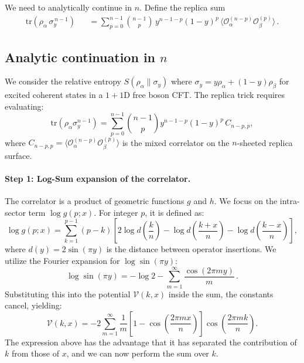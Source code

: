 \documentclass[11pt]{article}
\newcommand{\tr}{\mathrm{tr}}
\begin{document}
We need to analytically continue in $n$. Define the replica sum
\begin{eqnarray}\label{Fn}
\tr(\rho_\alpha\,\sigma_y^{\,n-1})
&&= \sum_{p=0}^{n-1} \binom{n-1}{p}\,y^{n-1-p}(1-y)^p\,
\langle \mathcal{O}_{\alpha}^{(n-p)} \mathcal{O}_{\beta}^{(p)} \rangle\,.
\end{eqnarray}

\subsection*{Analytic continuation in $n$}

We consider the relative entropy $S(\rho_\alpha \| \sigma_y)$ where $\sigma_y = y \rho_\alpha + (1-y)\rho_\beta$ for excited coherent states in a $1+1$D free boson CFT. The replica trick requires evaluating:
\begin{equation}
\tr(\rho_\alpha \sigma_y^{n-1}) = \sum_{p=0}^{n-1} \binom{n-1}{p} y^{n-1-p} (1-y)^p\, C_{n-p, p},
\end{equation}
where $C_{n-p, p} = \langle \mathcal{O}_\alpha^{(n-p)} \mathcal{O}_\beta^{(p)} \rangle$ is the mixed correlator on the $n$-sheeted replica surface.

\paragraph{Step 1: Log-Sum expansion of the correlator.}
The correlator is a product of geometric functions $g$ and $h$. We focus on the intra-sector term $\log g(p;x)$. For integer $p$, it is defined as:
\begin{equation}
\log g(p;x) = \sum_{k=1}^{p-1} (p-k) \left[ 2 \log d\left(\frac{k}{n}\right) - \log d\left(\frac{k+x}{n}\right) - \log d\left(\frac{k-x}{n}\right) \right],
\end{equation}
where $d(y) = 2\sin(\pi y)$ is the distance between operator insertions. We utilize the Fourier expansion for $\log \sin(\pi y)$:
\begin{equation}
\log \sin(\pi y) = -\log 2 - \sum_{m=1}^{\infty} \frac{\cos(2\pi m y)}{m}\,.
\end{equation}
Substituting this into the potential $\mathcal{V}(k,x)$ inside the sum, the constants cancel, yielding:
\begin{equation}
\mathcal{V}(k,x) = -2 \sum_{m=1}^{\infty} \frac{1}{m} \left[ 1 - \cos\left(\frac{2\pi m x}{n}\right) \right] \cos\left(\frac{2\pi m k}{n}\right).
\end{equation}
The expression above has the advantage that it has separated the contribution of $k$ from those of $x$, and we can now perform the sum over $k$.
\end{document}
